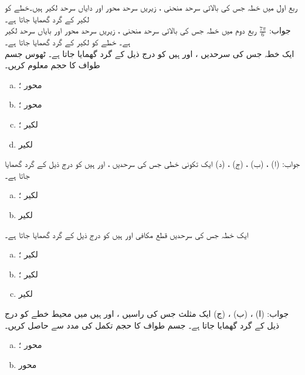 ربع اول میں خطہ جس کی بالائی سرحد منحنی ، زیریں سرحد محور  اور دایاں سرحد لکیر  ہیں۔خطے کو لکیر  کے گرد گھمایا جاتا ہے۔\\
جواب:\quad
$\tfrac{7\pi}{6}$
ربع دوم میں خطہ جس کی بالائی سرحد منحنی ، زیریں سرحد محور  اور بایاں سرحد لکیر  ہے۔ خطے کو لکیر  کے گرد گھمایا جاتا ہے۔
\\
ایک خطہ جس کی سرحدیں ،  اور  ہیں کو درج ذیل کے گرد گھمایا جاتا ہے۔ ٹھوس جسم طواف کا حجم معلوم کریں۔
\begin{enumerate}[a.]
\item
محور ؛
\item
محور ؛
\item
لکیر ؛
\item
لکیر 
\end{enumerate}
جواب:\quad
(ا) ، (ب) ، (ج) ، (د) 
ایک تکونی خطی جس کی سرحدیں ،  اور  ہیں کو درج ذیل کے گرد گھمایا جاتا ہے۔
\begin{enumerate}[a.]
\item
لکیر ؛
\item
لکیر 
\end{enumerate}
ایک خطہ جس کی سرحدیں قطع مکافی  اور  ہیں کو درج ذیل کے گرد گھمایا جاتا ہے۔
\begin{enumerate}[a.]
\item
لکیر ؛
\item
لکیر ؛
\item
لکیر 
\end{enumerate}
جواب:\quad
(ا) ، (ب) ، (ج) 
ایک مثلث جس کی راسیں ،  اور  ہیں میں محیط خطے کو درج ذیل کے گرد گھمایا جاتا ہے۔ جسم طواف کا حجم تکمل کی مدد سے حاصل کریں۔
\begin{enumerate}[a.]
\item
محور ؛
\item
محور 
\end{enumerate}
